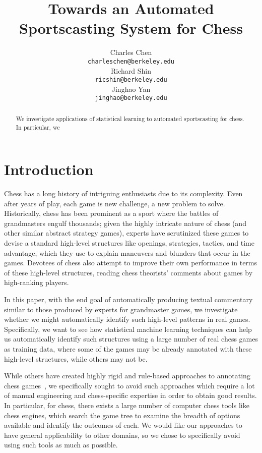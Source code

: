 \documentclass[11pt]{article}
\title{Towards an Automated Sportscasting System for Chess}
\author{
  Charles Chen \\
  {\tt charleschen@berkeley.edu} \\
\And
  Richard Shin \\
  {\tt ricshin@berkeley.edu} \\
\And
  Jinghao Yan \\
  {\tt jinghao@berkeley.edu} \\
}
\date{}
\begin{document}
\maketitle

\begin{abstract}
We investigate applications of statistical learning to automated sportscasting for chess. In particular, we 
\end{abstract}

\section{Introduction}
Chess has a long history of intriguing enthusiasts due to its complexity. Even after years of play, each game is new challenge, a new problem to solve. Historically, chess has been prominent as a sport where the battles of grandmasters engulf thousands; given the highly intricate nature of chess (and other similar abstract strategy games), experts have scrutinized these games to devise a standard high-level structures like openings, strategies, tactics, and time advantage, which they use to explain maneuvers and blunders that occur in the games. Devotees of chess also attempt to improve their own performance in terms of these high-level structures, reading chess theorists' comments about games by high-ranking players. 

In this paper, with the end goal of automatically producing textual commentary similar to those produced by experts for grandmaster games, we investigate whether we might automatically identify such high-level patterns in real games. Specifically, we want to see how statistical machine learning techniques can help us automatically identify such structures using a large number of real chess games as training data, where some of the games may be already annotated with these high-level structures, while others may not be.

While others have created highly rigid and rule-based approaches to annotating chess games~\cite{cambridge-chess-annotation}, we specifically sought to avoid such approaches which require a lot of manual engineering and chess-specific expertise in order to obtain good results. In particular, for chess, there exists a large number of computer chess tools like chess engines, which search the game tree to examine the breadth of options available and identify the outcomes of each. We would like our approaches to have general applicability to other domains, so we chose to specifically avoid using such tools as much as possible. 
\end{document}
